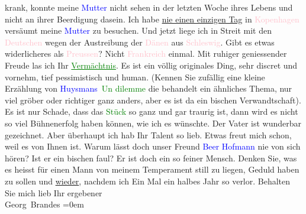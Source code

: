                     krank, konnte meine \textcolor{blue}{Mutter}{}
                    nicht sehen in der letzten Woche ihres Lebens und nicht an ihrer Beerdigung
                    dasein. Ich habe \uline{nie einen einzigen Tag} in \textcolor{pink}{Kopenhagen}{}\ledrightnote{\textcolor{pink}{Kopenhagen}} versäumt meine \textcolor{blue}{Mutter}{} zu besuchen.\pend
           \pstart
           Und jetzt liege ich in Streit mit den \textcolor{pink}{Deutschen}{}\ledrightnote{\textcolor{pink}{Deutschland}}
                    wegen der Austreibung der \textcolor{pink}{Dänen}{}\ledrightnote{\textcolor{pink}{Dänemark}} aus \textcolor{pink}{Schleswig}{}\ledrightnote{\textcolor{pink}{Südschleswig}}. Gibt es etwas widerlicheres als {\pb}\textcolor{pink}{Preussen}{}\ledrightnote{\textcolor{pink}{Preußen}}? Nicht \textcolor{pink}{Frankreich}{}\ledrightnote{\textcolor{pink}{Frankreich}} einmal.\pend
           \pstart
           Mit ruhiger geniessender Freude las ich Ihr \textcolor{green}{\uline{Vermächtnis}}{}\ledrightnote{\textcolor{green}{Das Vermächtnis. Schauspiel in drei Akten}}. Es ist ein völlig
                    originales Ding, sehr discret und vornehm, tief pessimistisch und human. (Kennen
                    Sie zufällig eine kleine Erzählung von \textcolor{blue}{Huysmans}{}\ledrightnote{\textcolor{blue}{Joris-Karl Huysmans}} \textcolor{green}{Un dilemme}{}\ledrightnote{\textcolor{green}{Ein Dilemma}} die behandelt
                    ein ähnliches Thema, nur viel gröber oder richtiger ganz anders, aber es ist da
                    ein bischen Verwandtschaft).\pend
           \pstart
           Es ist nur Schade, dass das \textcolor{green}{Stück}{}
               so ganz und gar traurig ist,
                    dann wird es nicht so viel Bühnenerfolg haben können, {\pb}wie ich es wünschte. Der
                    Vater ist wunderbar gezeichnet. Aber überhaupt ich hab Ihr Talent so lieb. Etwas
                    freut mich schon, weil es von Ihnen ist.\pend
           \pstart
           Warum lässt doch unser Freund \textcolor{blue}{Beer Hofmann}{}\ledrightnote{\textcolor{blue}{Richard Beer-Hofmann}}
                    nie von sich hören? Ist er ein bischen faul? Er ist doch ein so feiner
                    Mensch.\pend
           \pstart
           Denken Sie, was es heisst für einen Mann von meinem Temperament still zu liegen,
                    Geduld haben zu sollen und \uline{wieder}, nachdem ich
                    Ein Mal ein halbes Jahr so verlor.\pend
           \pstart
           Behalten Sie mich lieb\pend
           \pstart
           Ihr ergebener{\\[\baselineskip]}\spacefill\mbox{Georg Brandes}\pend
           \leftskip=0em{}\endnumbering{}  
      